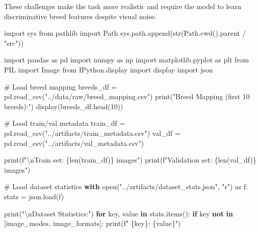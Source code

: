 \documentclass[
  letterpaper,
  DIV=11,
  numbers=noendperiod]{scrartcl}
\newenvironment{Shaded}{\begin{snugshade}}{\end{snugshade}}
\newcommand{\BuiltInTok}[1]{\textcolor[rgb]{0.00,0.23,0.31}{#1}}
\newcommand{\CharTok}[1]{\textcolor[rgb]{0.13,0.47,0.30}{#1}}
\newcommand{\CommentTok}[1]{\textcolor[rgb]{0.37,0.37,0.37}{#1}}
\newcommand{\ControlFlowTok}[1]{\textcolor[rgb]{0.00,0.23,0.31}{\textbf{#1}}}
\newcommand{\DecValTok}[1]{\textcolor[rgb]{0.68,0.00,0.00}{#1}}
\newcommand{\ImportTok}[1]{\textcolor[rgb]{0.00,0.46,0.62}{#1}}
\newcommand{\KeywordTok}[1]{\textcolor[rgb]{0.00,0.23,0.31}{\textbf{#1}}}
\newcommand{\NormalTok}[1]{\textcolor[rgb]{0.00,0.23,0.31}{#1}}
\newcommand{\OperatorTok}[1]{\textcolor[rgb]{0.37,0.37,0.37}{#1}}
\newcommand{\SpecialCharTok}[1]{\textcolor[rgb]{0.37,0.37,0.37}{#1}}
\newcommand{\SpecialStringTok}[1]{\textcolor[rgb]{0.13,0.47,0.30}{#1}}
\newcommand{\StringTok}[1]{\textcolor[rgb]{0.13,0.47,0.30}{#1}}
\renewenvironment{Shaded}{%
  \begin{tcolorbox}[%
    enhanced,%
    colback=codebg,%
    colframe=codebg,%
    borderline west={3pt}{0pt}{sectionblue},%
    boxrule=0pt,%
    arc=0pt,%
    boxsep=5pt,%
    left=2mm,%
    right=2mm,%
    top=2mm,%
    bottom=2mm%
  ]%
}{%
  \end{tcolorbox}%
}
\begin{document}
These challenges make the task more realistic and require the model to
learn discriminative breed features despite visual noise.

\begin{Shaded}
\begin{Highlighting}[]
\ImportTok{import}\NormalTok{ sys}
\ImportTok{from}\NormalTok{ pathlib }\ImportTok{import}\NormalTok{ Path}
\NormalTok{sys.path.append(}\BuiltInTok{str}\NormalTok{(Path.cwd().parent }\OperatorTok{/} \StringTok{"src"}\NormalTok{))}

\ImportTok{import}\NormalTok{ pandas }\ImportTok{as}\NormalTok{ pd}
\ImportTok{import}\NormalTok{ numpy }\ImportTok{as}\NormalTok{ np}
\ImportTok{import}\NormalTok{ matplotlib.pyplot }\ImportTok{as}\NormalTok{ plt}
\ImportTok{from}\NormalTok{ PIL }\ImportTok{import}\NormalTok{ Image}
\ImportTok{from}\NormalTok{ IPython.display }\ImportTok{import}\NormalTok{ display}
\ImportTok{import}\NormalTok{ json}

\CommentTok{\# Load breed mapping}
\NormalTok{breeds\_df }\OperatorTok{=}\NormalTok{ pd.read\_csv(}\StringTok{"../data/raw/breed\_mapping.csv"}\NormalTok{)}
\BuiltInTok{print}\NormalTok{(}\StringTok{"Breed Mapping (first 10 breeds):"}\NormalTok{)}
\NormalTok{display(breeds\_df.head(}\DecValTok{10}\NormalTok{))}

\CommentTok{\# Load train/val metadata}
\NormalTok{train\_df }\OperatorTok{=}\NormalTok{ pd.read\_csv(}\StringTok{"../artifacts/train\_metadata.csv"}\NormalTok{)}
\NormalTok{val\_df }\OperatorTok{=}\NormalTok{ pd.read\_csv(}\StringTok{"../artifacts/val\_metadata.csv"}\NormalTok{)}

\BuiltInTok{print}\NormalTok{(}\SpecialStringTok{f"}\CharTok{\textbackslash{}n}\SpecialStringTok{Train set: }\SpecialCharTok{\{}\BuiltInTok{len}\NormalTok{(train\_df)}\SpecialCharTok{\}}\SpecialStringTok{ images"}\NormalTok{)}
\BuiltInTok{print}\NormalTok{(}\SpecialStringTok{f"Validation set: }\SpecialCharTok{\{}\BuiltInTok{len}\NormalTok{(val\_df)}\SpecialCharTok{\}}\SpecialStringTok{ images"}\NormalTok{)}

\CommentTok{\# Load dataset statistics}
\ControlFlowTok{with} \BuiltInTok{open}\NormalTok{(}\StringTok{"../artifacts/dataset\_stats.json"}\NormalTok{, }\StringTok{"r"}\NormalTok{) }\ImportTok{as}\NormalTok{ f:}
\NormalTok{    stats }\OperatorTok{=}\NormalTok{ json.load(f)}
    
\BuiltInTok{print}\NormalTok{(}\StringTok{"}\CharTok{\textbackslash{}n}\StringTok{Dataset Statistics:"}\NormalTok{)}
\ControlFlowTok{for}\NormalTok{ key, value }\KeywordTok{in}\NormalTok{ stats.items():}
    \ControlFlowTok{if}\NormalTok{ key }\KeywordTok{not} \KeywordTok{in}\NormalTok{ [}\StringTok{\textquotesingle{}image\_modes\textquotesingle{}}\NormalTok{, }\StringTok{\textquotesingle{}image\_formats\textquotesingle{}}\NormalTok{]:}
        \BuiltInTok{print}\NormalTok{(}\SpecialStringTok{f"  }\SpecialCharTok{\{}\NormalTok{key}\SpecialCharTok{\}}\SpecialStringTok{: }\SpecialCharTok{\{}\NormalTok{value}\SpecialCharTok{\}}\SpecialStringTok{"}\NormalTok{)}
        

\end{Highlighting}
\end{Shaded}
\end{document}
